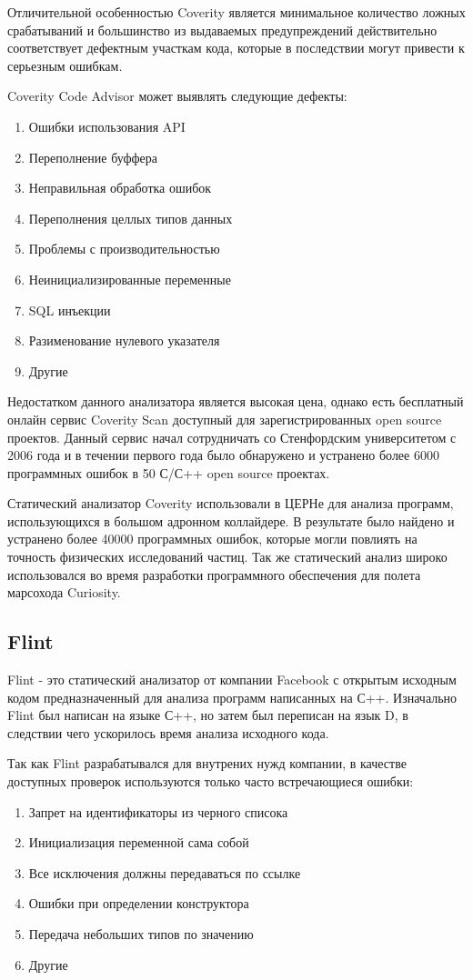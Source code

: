 Отличительной особенностью Coverity является минимальное количество ложных срабатываний и большинство 
из выдаваемых предупреждений действительно соответствует дефектным участкам кода, которые в последствии могут
привести к серьезным ошибкам.

Coverity Code Advisor может выявлять следующие дефекты:
\begin{enumerate}
	\item Ошибки использования API
	\item Переполнение буффера
	\item Неправильная обработка ошибок
	\item Переполнения целлых типов данных
	\item Проблемы с производительностью
	\item Неинициализированные переменные
	\item SQL инъекции
	\item Разименование нулевого указателя
	\item Другие
\end{enumerate}
 
Недостатком данного анализатора является высокая цена, однако есть бесплатный онлайн сервис
Coverity Scan доступный для зарегистрированных open source проектов. Данный сервис начал сотрудничать
со Стенфордским университетом с 2006 года и в течении первого года было обнаружено и устранено
более 6000 программных ошибок в 50 С/С++ open source проектах. 

Статический анализатор Coverity использовали в ЦЕРНе для анализа программ, использующихся в 
большом адронном коллайдере. В результате было найдено и устранено более 40000 программных 
ошибок, которые могли повлиять на точность физических исследований частиц. Так же статический анализ
широко использовался во время разработки программного обеспечения для полета марсохода Curiosity.   
 
\subsection{Flint}
Flint - это статический анализатор от компании Facebook с открытым исходным кодом предназначенный 
для анализа программ написанных на С++. Изначально Flint был написан на языке С++, но затем 
был переписан на язык D, в следствии чего ускорилось время анализа исходного кода. 

Так как Flint разрабатывался для внутрених нужд компании, в качестве доступных проверок используются 
только часто встречающиеся ошибки:
\begin{enumerate}
	\item Запрет на идентификаторы из черного списока
	\item Инициализация переменной сама собой
	\item Все исключения должны передаваться по ссылке
	\item Ошибки при определении конструктора
	\item Передача небольших типов по значению
	\item Другие
\end{enumerate}

